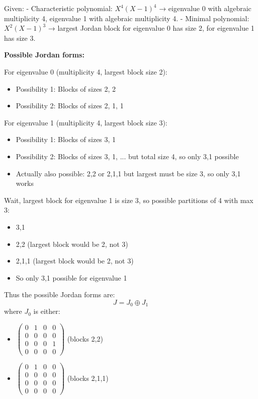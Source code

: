 \documentclass[12pt]{article}
\begin{document}
\begin{correctionbox}
Given:
- Characteristic polynomial: $X^4(X-1)^4$ → eigenvalue 0 with algebraic multiplicity 4, eigenvalue 1 with algebraic multiplicity 4.
- Minimal polynomial: $X^2(X-1)^3$ → largest Jordan block for eigenvalue 0 has size 2, for eigenvalue 1 has size 3.

\textbf{Possible Jordan forms:}

For eigenvalue 0 (multiplicity 4, largest block size 2):
\begin{itemize}
  \item Possibility 1: Blocks of sizes 2, 2
  \item Possibility 2: Blocks of sizes 2, 1, 1
\end{itemize}

For eigenvalue 1 (multiplicity 4, largest block size 3):
\begin{itemize}
  \item Possibility 1: Blocks of sizes 3, 1
  \item Possibility 2: Blocks of sizes 3, 1, ... but total size 4, so only 3,1 possible
  \item Actually also possible: 2,2 or 2,1,1 but largest must be size 3, so only 3,1 works
\end{itemize}

Wait, largest block for eigenvalue 1 is size 3, so possible partitions of 4 with max 3:

\begin{itemize}
  \item 3,1 
  \item 2,2  (largest block would be 2, not 3)
  \item 2,1,1  (largest block would be 2, not 3)
  \item So only 3,1 possible for eigenvalue 1
\end{itemize}

Thus the possible Jordan forms are:
\[
J = J_0 \oplus J_1
\]
where $J_0$ is either:
\begin{itemize}
  \item $\begin{pmatrix} 0 & 1 & 0 & 0 \\ 0 & 0 & 0 & 0 \\ 0 & 0 & 0 & 1 \\ 0 & 0 & 0 & 0 \end{pmatrix}$ (blocks 2,2)
  \item $\begin{pmatrix} 0 & 1 & 0 & 0 \\ 0 & 0 & 0 & 0 \\ 0 & 0 & 0 & 0 \\ 0 & 0 & 0 & 0 \end{pmatrix}$ (blocks 2,1,1)
\end{itemize}


\end{correctionbox}
\end{document}
